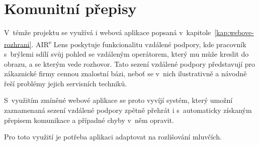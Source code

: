 \section{Komunitní přepisy}

V~témže projektu se využívá i webová aplikace popsaná
v~kapitole~\ref{kap:webove-rozhrani}. AIR\textsuperscript{e} Lens poskytuje funkcionalitu
vzdálené podpory, kde pracovník s~brýlemi sdílí svůj pohled se vzdáleným
operátorem, který mu může kreslit do obrazu, a se kterým vede rozhovor. Tato
sezení vzdálené podpory představují pro zákaznické firmy cennou znalostní bázi,
neboť se v~nich ilustrativně a návodně řeší problémy jejich servisních techniků.

S~využitím zmíněné webové aplikace se proto vyvíjí systém, který umožní
zaznamenaná sezení vzdálené podpory zpětně přehrát i s~automaticky získaným
přepisem komunikace a případné chyby v~něm opravit.

Pro toto využití je potřeba aplikaci adaptovat na rozlišování mluvčích.
